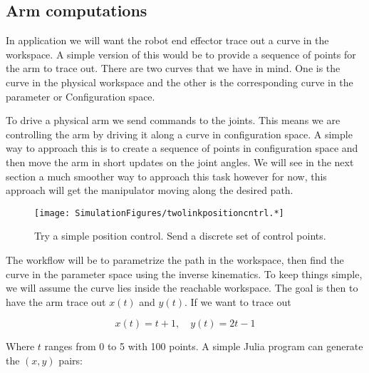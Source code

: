 \hypertarget{arm-computations}{%
\subsection{Arm computations}\label{arm-computations}}

In application we will want the robot end effector trace out a curve in
the workspace. A simple version of this would be to provide a sequence
of points for the arm to trace out. There are two curves that we have in
mind. One is the curve in the physical workspace and the other is the
corresponding curve in the parameter or Configuration space.

To drive a physical arm we send commands to the joints. This means we
are controlling the arm by driving it along a curve in configuration
space. A simple way to approach this is to create a sequence of points
in configuration space and then move the arm in short updates on the
joint angles. We will see in the next section a much smoother way to
approach this task however for now, this approach will get the
manipulator moving along the desired path.

\begin{figure}
\centering
\texttt{[image: SimulationFigures/twolinkpositioncntrl.*]}
\caption{Try a simple position control. Send a discrete set of control
points.}
\end{figure}

The workflow will be to parametrize the path in the workspace, then find
the curve in the parameter space using the inverse kinematics. To keep
things simple, we will assume the curve lies inside the reachable
workspace. The goal is then to have the arm trace out \(x(t)\) and
\(y(t)\). If we want to trace out

\[x(t) = t+1, \quad y(t) = 2t - 1\]

Where \(t\) ranges from 0 to 5 with 100 points. A simple Julia program
can generate the \((x,y)\) pairs:

\hypertarget{lst:mostbasicloop}{%
\label{lst:mostbasicloop}}%
\begin{Shaded}
\begin{Highlighting}[]
\OperatorTok{=} \OperatorTok{:}
\OperatorTok{=}\OperatorTok{/}
\OperatorTok{=}\OperatorTok{+}
\OperatorTok{=} \OperatorTok{*}\OperatorTok{{-}}
\OperatorTok{,}\OperatorTok{,} \OperatorTok{,}\OperatorTok{,}\NormalTok{)}
\end{Highlighting}
\end{Shaded}


